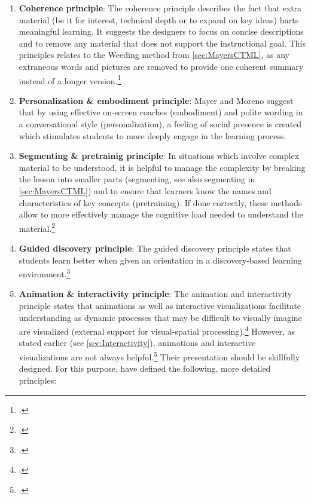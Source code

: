 \begin{enumerate}
    \item \textbf{Coherence principle}: The coherence principle describes the fact that extra material (be it for interest, technical depth or to expand on key ideas) hurts meaningful learning. It suggests the designers to focus on concise descriptions and to remove any material that does not support the instructional goal. This principles relates to the Weeding method from \ref{sec:MayersCTML}, as any extraneous words and pictures are removed to provide one coherent summary instead of a longer version.\footcites[Cf.][chapter 8, paragraphs 1 et seq]{ClarkElearningscienceinstruction2016}[cf.][p.6]{MayerMultimediaLearning2009}[cf.][p.22]{MayerAnimationAidMultimedia2001}
    \item \textbf{Personalization \& embodiment principle}: Mayer and Moreno suggest that by using effective on-screen coaches (embodiment) and polite wording in a conversational style (personalization), a feeling of social presence is created which stimulates students to more deeply engage in the learning process. 
    \item \textbf{Segmenting \& pretrainig principle}: In situations which involve complex material to be understood, it is helpful to manage the complexity by breaking the lesson into smaller parts (segmenting, see also segmenting in \ref{sec:MayersCTML}) and to ensure that learners know the names and characteristics of key concepts (pretraining). If done correctly, these methods allow to more effectively manage the cognitive load needed to understand the material.\footcites[Cf.][chapters 9 and 10]{ClarkElearningscienceinstruction2016}
    \item \textbf{Guided discovery principle}: The guided discovery principle states that students learn better when given an orientation in a discovery-based learning environment.\footcites[Cf.][p.7]{MayerMultimediaLearning2009}
    \item \textbf{Animation \& interactivity principle}: The animation and interactivity principle states that animations as well as interactive visualizations facilitate understanding as dynamic processes that may be difficult to visually imagine are visualized (external support for visual-spatial processing).\footcites[Cf.][p.290]{Betrancourtanimationinteractivityprinciples2005}[cf.][p.81]{MunzerLearningmultimediapresentations2009}[cf.][p.19]{LeeScreenDesignGuidelines1999}[cf.][p.814]{MayerNineWaysReduce2003} However, as stated earlier (see \ref{sec:Interactivity}), animations and interactive visualizations are not always helpful.\footcites[Cf.][p.292]{PatwardhanWhendoeshigher2015}[cf.][p.7]{MayerMultimediaLearning2009} Their presentation should be skillfully designed. For this purpose, \cite{MorenoInteractiveMultimodalLearning2007} have defined the following, more detailed principles: 

\end{enumerate}
